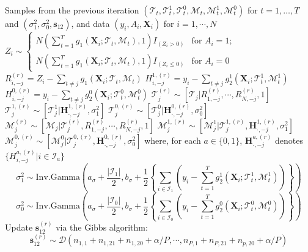 \documentclass[preview,border=5pt]{standalone}
\begin{document}
\nopagecolor
\begin{algorithmic}[1]
\Require Samples from the previous iteration $(\mathcal{T}_t, \mathcal{T}^1_t, \mathcal{T}^0_t,\mathcal{M}_t,\mathcal{M}_t^1,\mathcal{M}_t^0)$ for $t=1, \ldots, T$ and $(\sigma_1^2, \sigma_0^2, \boldsymbol{s}_{12})$, and data $(y_i, A_i, \boldsymbol{X}_i)$ for $i=1, \cdots, N$
\State $Z_i \sim \left\{ \begin{array}{ll}
         N\left(\sum_{t=1}^T g_1(\boldsymbol{X}_i; \mathcal{T}_t, \mathcal{M}_t), 1\right)I_{(Z_i  > 0)} & \mbox{for $A_i =1 $};\\
        N\left(\sum_{t=1}^T g_1(\boldsymbol{X}_i; \mathcal{T}_t, \mathcal{M}_t), 1\right)I_{(Z_i  \leq 0)} & \mbox{for $A_i = 0 $}\end{array} \right.$ 
\EndFor
{}
\State $R_{i,-j}^{(r)} = Z_i - \sum_{t\neq j} g_1(\boldsymbol{X}_i; \mathcal{T}_t, \mathcal{M}_t)$  
\State $H_{i,-j}^{1, (r)} = y_i - \sum_{t\neq j} g_2^1(\boldsymbol{X}_i; \mathcal{T}_t^1, \mathcal{M}_t^1)$  
\State $H_{i,-j}^{0, (r)} = y_i - \sum_{t\neq j} g_2^0(\boldsymbol{X}_i; \mathcal{T}_t^0, \mathcal{M}_t^0)$  
\EndFor
\State $\mathcal{T}_j^{(r)} \sim [\mathcal{T}_j | R_{1, -j}^{(r)}, \cdots, R_{N, -j}^{(r)}, 1]$  
\State $\mathcal{T}_j^{1,(r)} \sim [\mathcal{T}_j^1 | \boldsymbol{H}_{\cdot, -j}^{1, (r)}, \sigma^2_1]$  
\State $\mathcal{T}_j^{0,(r)} \sim [\mathcal{T}_j^0 | \boldsymbol{H}_{\cdot, -j}^{0, (r)}, \sigma^2_0]$  
\State $\mathcal{M}_j^{(r)} \sim [\mathcal{M}_j | \mathcal{T}_j^{(r)}, R_{1, -j}^{(r)}, \cdots, R_{N, -j}^{(r)}, 1]$
\State $\mathcal{M}_j^{1,(r)} \sim [\mathcal{M}_j^1 | \mathcal{T}_j^{1,(r)}, \boldsymbol{H}_{\cdot, -j}^{1,(r)}, \sigma^2_1]$
\State $\mathcal{M}_j^{0,(r)} \sim [\mathcal{M}_j^0 | \mathcal{T}_j^{0,(r)}, \boldsymbol{H}_{\cdot, -j}^{0,(r)}, \sigma^2_0]$
where, for each $a\in\{0,1\}$, $\boldsymbol{H}_{\cdot, -j}^{a, (r)}$ denotes $\{H_{i, -j}^{a, (r)} | i \in \mathcal{I}_a\}$
\EndFor
\State \[\sigma^2_{1} \sim \text{Inv.Gamma}\left(a_\sigma+\frac{|\mathcal{I}_1|}{2}, b_\sigma+\frac{1}{2}\left\{\sum_{i \in \mathcal{I}_1} \left(y_i - \sum_{t=1}^T g_2^1(\boldsymbol{X}_i; \mathcal{T}_t^1, \mathcal{M}_t^1)\right) \right\}\right)\]
\[\sigma^2_{0} \sim \text{Inv.Gamma}\left(a_\sigma+\frac{|\mathcal{I}_0|}{2}, b_\sigma+\frac{1}{2}\left\{\sum_{i \in \mathcal{I}_0} \left(y_i - \sum_{t=1}^T g_2^0(\boldsymbol{X}_i; \mathcal{T}_t^0, \mathcal{M}_t^0)\right) \right\}\right)\]
\State Update $\boldsymbol{s}_{12}^{(r)}$ via the Gibbs algorithm:
 \[\boldsymbol{s}_{12}^{(r)} \sim \mathcal{D}\left(n_{1,1}+n_{1,21}+n_{1,20} + \alpha/P, \cdots, n_{P,1}+n_{P,21}+n_{p,20} + \alpha/P\right)\]
\EndFor
\end{algorithmic}
\end{document}
